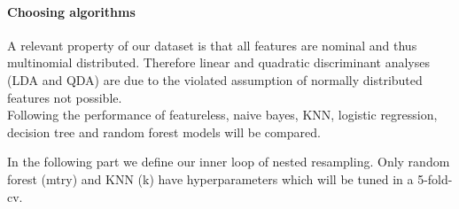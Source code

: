 \documentclass[
]{article}
\let\oldparagraph\paragraph
\renewcommand{\paragraph}[1]{\oldparagraph{#1}\mbox{}}
\begin{document}
\hypertarget{choosing-algorithms}{%
\paragraph{Choosing algorithms}\label{choosing-algorithms}}

A relevant property of our dataset is that all features are nominal and
thus multinomial distributed. Therefore linear and quadratic
discriminant analyses (LDA and QDA) are due to the violated assumption
of normally distributed features not possible.\\
Following the performance of featureless, naive bayes, KNN, logistic
regression, decision tree and random forest models will be compared.

In the following part we define our inner loop of nested resampling.
Only random forest (mtry) and KNN (k) have hyperparameters which will be
tuned in a 5-fold-cv.
\end{document}
